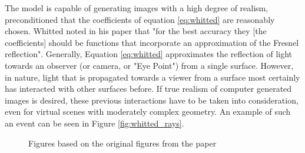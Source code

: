 The model is capable of generating images with a high degree of realism, preconditioned that the coefficients of equation \ref{eq:whitted} are reasonably chosen. Whitted noted in his paper that "for the best
accuracy they [the coefficients] should be functions that incorporate an
approximation of the Fresnel reflection". 
Generally, Equation \ref{eq:whitted} approximates the reflection of light towards an observer (or camera, or "Eye Point") from a single surface. However, in nature, light that is propagated towards a viewer from a surface most certainly has interacted with other surfaces before. If true realism of computer generated images is desired, these previous interactions have to be taken into consideration, even for virtual scenes with moderately complex geometry. An example of such an event can be seen in Figure \ref{fig:whitted_rays}.

\begin{figure}[h]
	\centering
	\hfill
	\caption{Figures based on the original figures from the paper  \cite{whitted1979improved}}
\end{figure}

